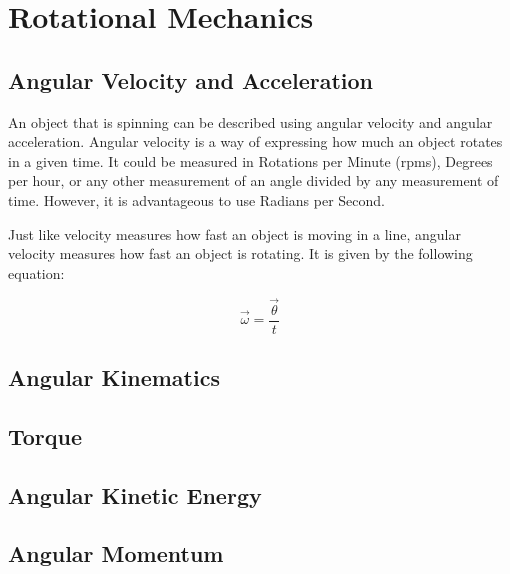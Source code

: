 \chapter{Rotational Mechanics}
	\section{Angular Velocity and Acceleration}
	An object that is spinning can be described using angular velocity and angular acceleration.  Angular velocity is a way of expressing how much an object rotates in a given time.  It could be measured in Rotations per Minute (rpms), Degrees per hour, or any other measurement of an angle divided by any measurement of time.  However, it is advantageous to use Radians per Second.
	
	  Just like velocity measures how fast an object is moving in a line, angular velocity measures how fast an object is rotating.    It is given by the following equation:
	  	\begin{mdframed}[backgroundcolor=orange!20!white]
	  \begin{equation}
		\vec{\omega} = \frac{\vec{\theta}}{t}
	  \end{equation}
	  
	\end{mdframed}
	\section{Angular Kinematics}
	\section{Torque}
	\section{Angular Kinetic Energy}
	\section{Angular Momentum}
	
	

		


	


